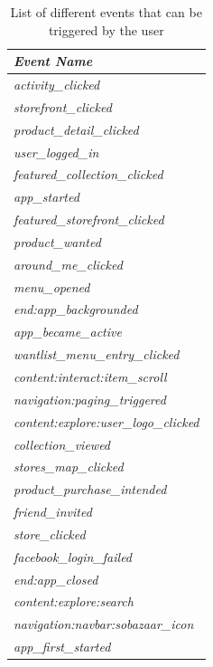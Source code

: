     \begin{table}[H]
        \centering
        \begin{tabular}{l}
            \toprule
            \emph{Event Name}   \\
            \midrule
            \emph{activity\_clicked}  \\
            \emph{storefront\_clicked}  \\
            \emph{product\_detail\_clicked}  \\
            \emph{user\_logged\_in}  \\
            \emph{featured\_collection\_clicked}  \\
            \emph{app\_started}  \\
            \emph{featured\_storefront\_clicked}  \\
            \emph{product\_wanted}  \\
            \emph{around\_me\_clicked}  \\
            \emph{menu\_opened}  \\
            \emph{end:app\_backgrounded}  \\
            \emph{app\_became\_active}  \\
            \emph{wantlist\_menu\_entry\_clicked}  \\
            \emph{content:interact:item\_scroll}  \\
            \emph{navigation:paging\_triggered}  \\
            \emph{content:explore:user\_logo\_clicked}  \\
            \emph{collection\_viewed}  \\
            \emph{stores\_map\_clicked}  \\
            \emph{product\_purchase\_intended}  \\
            \emph{friend\_invited}  \\
            \emph{store\_clicked}  \\
            \emph{facebook\_login\_failed}  \\
            \emph{end:app\_closed}  \\
            \emph{content:explore:search}  \\
            \emph{navigation:navbar:sobazaar\_icon}  \\
            \emph{app\_first\_started}  \\
            \bottomrule
        \end{tabular}
        \label{table:events}
        \caption[List of Different Events]{List of different events that can be triggered by the user}
    \end{table}

